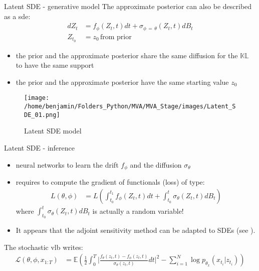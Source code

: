 \begin{frame}{Latent SDE - generative model}
    The approximate posterior can also be described as a \gls{sde}:
        \begin{align}
            dZ_t &= f_{\phi}(Z_t,t)dt + \sigma_{\phi \, = \, \theta}(Z_t,t)dB_t \\
            Z_{t_0} &= z_0 \, \text{from prior}
        \end{align}
        \begin{itemize}
            \item the prior and the approximate posterior share the same diffusion for the $\mathbb{KL}$ to have the same support
            \item the prior and the approximate posterior have the same starting value $z_0$
        \end{itemize}
    \begin{figure}[H]
        \centering
        \texttt{[image: /home/benjamin/Folders\_Python/MVA/MVA\_Stage/images/Latent\_SDE\_01.png]}
        \caption{Latent SDE model}
        \label{fig:Latent SDE}
    \end{figure}
\end{frame}

\begin{frame}{Latent SDE - inference}
    \begin{itemize}
        \item neural networks to learn the drift $f_{\phi}$ and the diffusion $\sigma_{\theta}$
        \item requires to compute the gradient of functionals (loss) of type:
            \begin{align}
                L(\theta, \phi) &= L \left( \int_{t_0}^{t_1} f_{\phi}(Z_t, t)dt + \int_{t_0}^{t} \sigma_{\theta}(Z_t,t)dB_t \right)
            \end{align}
            where $\int_{t_0}^{t} \sigma_{\theta}(Z_t,t)dB_t$ is actually a random variable!
        \item It appears that the adjoint sensitivity method can be adapted to SDEs (see \cite{li_scalable_2020}).
    \end{itemize}
    
    The stochastic \gls{vlb} writes:
    \begin{align}
        \mathcal{L}(\theta, \phi, x_{1:T}) &= \mathbb{E} \left(
            \frac{1}{2}\int_{0}^{T} \vert \frac{f_{\theta}(z_t,t) - f_{\phi}(z_t,t)}{\sigma_{\theta}(z_t,t)}dt \vert^{2} - 
            \sum_{i=1}^{N} \log{p_{\theta_x}}(x_{t_i} \vert z_{t_i})
            \right)
    \end{align}
\end{frame}